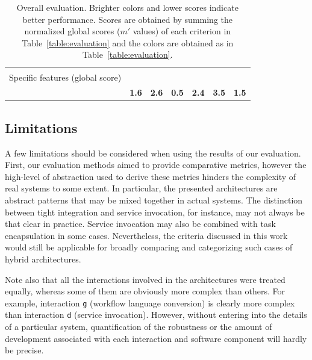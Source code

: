 \documentclass[preprint,3p,twocolumn]{elsarticle}
\begin{document}
\begin{table}
\begin{tabular}{rcccccc}
                                     & \cellcolor[HTML]{99CC99}{0.50}
                                     & \cellcolor[HTML]{99CC99}{0.50}\\
Specific features (global score) & \cellcolor[HTML]{99FF99}{0.00}
                                     & \cellcolor[HTML]{999999}{1.00}
                                     & \cellcolor[HTML]{99FF99}{0.00}
                                     & \cellcolor[HTML]{999999}{1.00}
                                     & \cellcolor[HTML]{99FF99}{0.00}
                                     & \cellcolor[HTML]{99FF99}{0.00}\\
                                    & \cellcolor[HTML]{99DA99}\textbf{1.6}
                                    & \cellcolor[HTML]{99B899}\textbf{2.6}
                                    & \cellcolor[HTML]{99FF99}\textbf{0.5}
                                    & \cellcolor[HTML]{99BF99}\textbf{2.4}
                                    & \cellcolor[HTML]{999999}\textbf{3.5}
                                    & \cellcolor[HTML]{99DE99}\textbf{1.5}\\
\end{tabular}
\caption{Overall evaluation. Brighter colors and lower scores indicate better performance. Scores
  are obtained by summing the normalized global scores ($m'$ values) of
  each criterion in Table~\ref{table:evaluation} and the colors are obtained as in Table~\ref{table:evaluation}. }
\label{table:overall}
\end{table}

\subsection{Limitations}


A few limitations should be considered when using the results of our
evaluation. First, our evaluation methods aimed to provide comparative
metrics, however the high-level of abstraction used to derive these
metrics hinders the complexity of real systems to some
extent. In particular, the
presented architectures are abstract patterns that may be mixed
together in actual systems. The distinction between tight integration and
service invocation, for instance, may not always be that clear in
practice. Service invocation may also be combined with task
encapsulation in some cases. Nevertheless, the criteria discussed in this
work would still be applicable for broadly comparing and categorizing such cases of
hybrid architectures.

Note also that all the interactions involved in the architectures were
treated equally, whereas some of them are obviously more complex than
others. For example, interaction \texttt{g} (workflow language
conversion) is clearly more complex than interaction \texttt{d}
(service invocation). However, without entering into the details of a particular
system, quantification of the robustness or the amount of development
associated with each interaction and software component will hardly be
precise.
\end{document}
